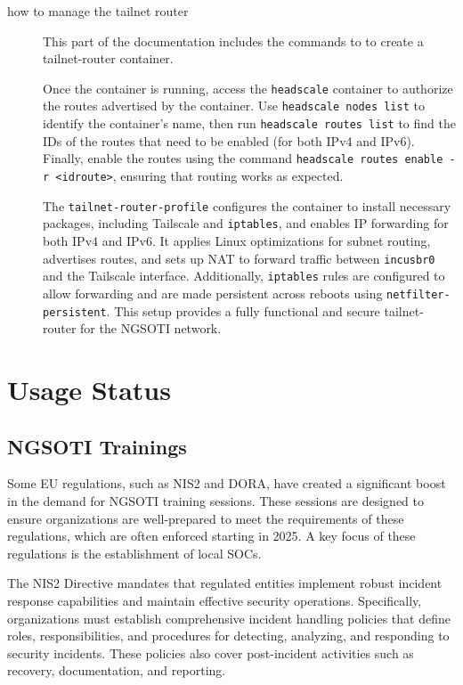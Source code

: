 \begin{description}
	\item [how to manage the tailnet router]
This part of the documentation includes the commands to to create a tailnet-router container.

Once the container is running, access the \texttt{headscale} container to authorize
the routes advertised by the container. Use \texttt{headscale nodes list} to identify
the container's name, then run \texttt{headscale routes list} to find the IDs of the
routes that need to be enabled (for both IPv4 and IPv6). Finally, enable the routes
using the command \texttt{headscale routes enable -r <idroute>}, ensuring that
routing works as expected.

The \texttt{tailnet-router-profile} configures the container to install necessary
packages, including Tailscale and \texttt{iptables}, and enables IP forwarding for
both IPv4 and IPv6. It applies Linux optimizations for subnet routing, advertises
routes, and sets up NAT to forward traffic between \texttt{incusbr0} and the Tailscale
interface. Additionally, \texttt{iptables} rules are configured to allow forwarding
and are made persistent across reboots using \texttt{netfilter-persistent}. This setup
provides a fully functional and secure tailnet-router for the NGSOTI network.

\end{description}

\chapter{Usage Status}\label{chuse}

\section{NGSOTI Trainings}\label{training}
Some EU regulations, such as NIS2 and DORA, have created a significant boost in the demand for NGSOTI training sessions. These sessions are designed to ensure organizations are well-prepared to meet the requirements of these regulations, which are often enforced starting in 2025. A key focus of these regulations is the establishment of local SOCs.

The NIS2 Directive mandates that regulated entities implement robust incident response capabilities and maintain effective security operations. Specifically, organizations must establish comprehensive incident handling policies that define roles, responsibilities, and procedures for detecting, analyzing, and responding to security incidents. These policies also cover post-incident activities such as recovery, documentation, and reporting.

